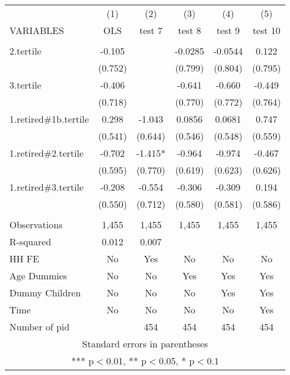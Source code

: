 \begin{tabular}{lccccc} \hline
 & (1) & (2) & (3) & (4) & (5) \\
VARIABLES & OLS & test 7 & test 8 & test 9 & test 10 \\ \hline
 &  &  &  &  &  \\
2.tertile & -0.105 &  & -0.0285 & -0.0544 & 0.122 \\
 & (0.752) &  & (0.799) & (0.804) & (0.795) \\
3.tertile & -0.406 &  & -0.641 & -0.660 & -0.449 \\
 & (0.718) &  & (0.770) & (0.772) & (0.764) \\
1.retired\#1b.tertile & 0.298 & -1.043 & 0.0856 & 0.0681 & 0.747 \\
 & (0.541) & (0.644) & (0.546) & (0.548) & (0.559) \\
1.retired\#2.tertile & -0.702 & -1.415* & -0.964 & -0.974 & -0.467 \\
 & (0.595) & (0.770) & (0.619) & (0.623) & (0.626) \\
1.retired\#3.tertile & -0.208 & -0.554 & -0.306 & -0.309 & 0.194 \\
 & (0.550) & (0.712) & (0.580) & (0.581) & (0.586) \\
 &  &  &  &  &  \\
Observations & 1,455 & 1,455 & 1,455 & 1,455 & 1,455 \\
R-squared & 0.012 & 0.007 &  &  &  \\
HH FE & No & Yes & No & No & No \\
Age Dummies & No & No & Yes & Yes & Yes \\
Dummy Children & No & No & No & Yes & Yes \\
Time & No & No & No & No & Yes \\
 Number of pid &  & 454 & 454 & 454 & 454 \\ \hline
\multicolumn{6}{c}{ Standard errors in parentheses} \\
\multicolumn{6}{c}{ *** p$<$0.01, ** p$<$0.05, * p$<$0.1} \\
\end{tabular}
